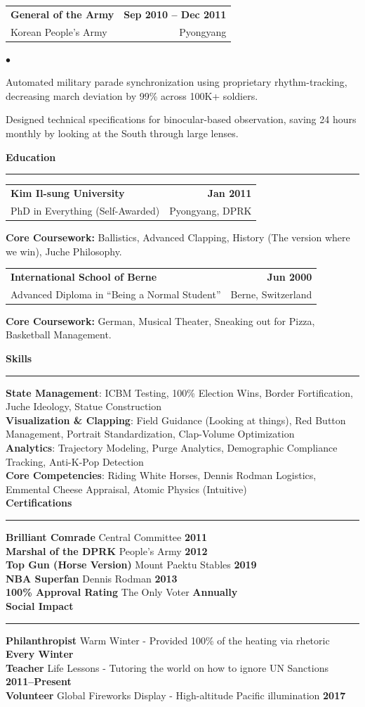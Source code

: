 \documentclass[11pt,letterpaper]{article}
\makeatletter
\newcommand{\ResumeSection}[1]{
    \vspace{10pt}
    {\large\textbf{#1}}\\[-2pt]
    \rule{\textwidth}{0.4pt}
    \vspace{4pt}
}
\newcommand{\WorkExperience}[5]{
    \begin{tabular*}{\textwidth}{@{}l @{\extracolsep{\fill}} r}
        \textbf{#1} & \textbf{#3} \\
        #2 & #4 \\
    \end{tabular*}
    \begin{list}{$\bullet$}{
        \setlength{\leftmargin}{1.2em}
        \setlength{\itemsep}{2pt}
        \setlength{\topsep}{2pt}
        \setlength{\parsep}{0pt}
        \setlength{\partopsep}{0pt}
    }
        \small #5
    \end{list}
    \vspace{4pt}
}
\newcommand{\EducationExperience}[4]{
    \begin{tabular*}{\textwidth}{@{}l @{\extracolsep{\fill}} r}
        \textbf{#1} & \textbf{#3} \\
        #2 & #4 \\
    \end{tabular*}
    \vspace{2pt}
}
\newcommand{\Certification}[3]{
    \textbf{#1} \textbar{} #2 \hfill \textbf{#3}\\[5pt]
}
\newcommand{\SkillItem}[2]{
    \textbf{#1}: #2\\[3pt]
}
\makeatother
\begin{document}
\WorkExperience
    {General of the Army}
    {Korean People's Army}
    {Sep 2010 -- Dec 2011}
    {Pyongyang}
    {
        \item Automated military parade synchronization using proprietary rhythm-tracking, decreasing march deviation by 99\% across 100K+ soldiers.
        \item Designed technical specifications for binocular-based observation, saving 24 hours monthly by looking at the South through large lenses.
    }

\ResumeSection{Education}
\EducationExperience
    {Kim Il-sung University}
    {PhD in Everything (Self-Awarded)}
    {Jan 2011}
    {Pyongyang, DPRK}
\textbf{Core Coursework:} Ballistics, Advanced Clapping, History (The version where we win), Juche Philosophy.

\vspace{3pt}

\EducationExperience
    {International School of Berne}
    {Advanced Diploma in ``Being a Normal Student''}
    {Jun 2000}
    {Berne, Switzerland}
\textbf{Core Coursework:} German, Musical Theater, Sneaking out for Pizza, Basketball Management.

\ResumeSection{Skills}
\SkillItem{State Management}{ICBM Testing, 100\% Election Wins, Border Fortification, Juche Ideology, Statue Construction}
\SkillItem{Visualization \& Clapping}{Field Guidance (Looking at things), Red Button Management, Portrait Standardization, Clap-Volume Optimization}
\SkillItem{Analytics}{Trajectory Modeling, Purge Analytics, Demographic Compliance Tracking, Anti-K-Pop Detection}
\SkillItem{Core Competencies}{Riding White Horses, Dennis Rodman Logistics, Emmental Cheese Appraisal, Atomic Physics (Intuitive)}

\ResumeSection{Certifications}
\Certification{Brilliant Comrade}{Central Committee}{2011}
\Certification{Marshal of the DPRK}{People's Army}{2012}
\Certification{Top Gun (Horse Version)}{Mount Paektu Stables}{2019}
\Certification{NBA Superfan}{Dennis Rodman}{2013}
\Certification{100\% Approval Rating}{The Only Voter}{Annually}

\ResumeSection{Social Impact}
\Certification{Philanthropist}{Warm Winter - Provided 100\% of the heating via rhetoric}{Every Winter}
\Certification{Teacher}{Life Lessons - Tutoring the world on how to ignore UN Sanctions}{2011--Present}
\Certification{Volunteer}{Global Fireworks Display - High-altitude Pacific illumination}{2017}
\end{document}
